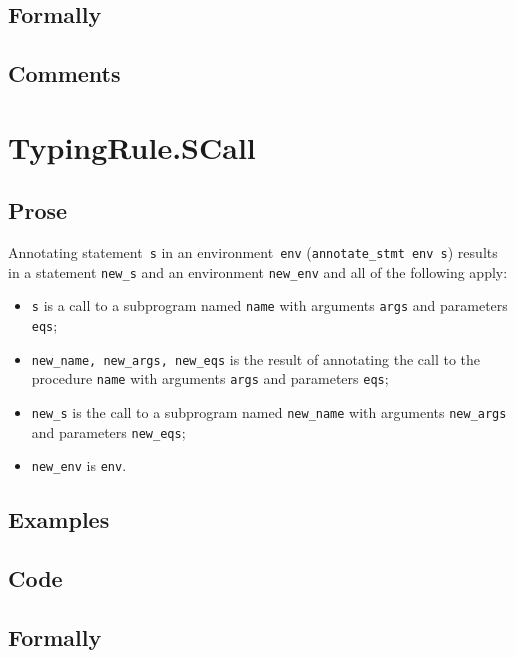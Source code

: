 \documentclass{book}
\begin{document}
  \subsection{Formally}

  \subsection{Comments}

\section{TypingRule.SCall \label{sec:TypingRule.SCall}}

    \subsection{Prose}
Annotating statement~\texttt{s} in an environment~\texttt{env}
(\texttt{annotate\_stmt env s}) results in a statement \texttt{new\_s} and an
environment \texttt{new\_env} and all of the following apply:
   \begin{itemize}
   \item \texttt{s} is a call to a subprogram named \texttt{name} with arguments \texttt{args} and parameters \texttt{eqs};
   \item \texttt{new\_name, new\_args, new\_eqs} is the result of annotating the call
      to the procedure \texttt{name} with arguments \texttt{args} and parameters
\texttt{eqs};
   \item \texttt{new\_s} is the call to a subprogram named \texttt{new\_name} with arguments
      \texttt{new\_args} and parameters \texttt{new\_eqs};
   \item \texttt{new\_env} is \texttt{env}.
   \end{itemize}

  \subsection{Examples}

  \subsection{Code}

  \subsection{Formally}
\end{document}
